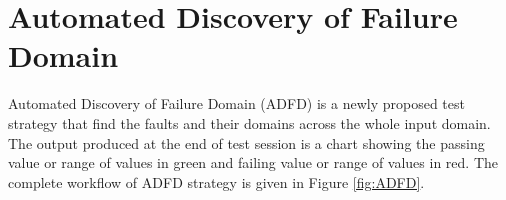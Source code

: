 \documentclass[runningheads,a4paper]{llncs}
\begin{document}


\section{Automated Discovery of Failure Domain}\label{sec:adfd}

Automated Discovery of Failure Domain (ADFD) is a newly proposed test strategy that find the faults and their domains across the whole input domain. The output produced at the end of test session is a chart showing the passing value or range of values in green and failing value or range of values in red. The complete workflow of ADFD strategy is given in Figure \ref{fig:ADFD}.
\end{document}
